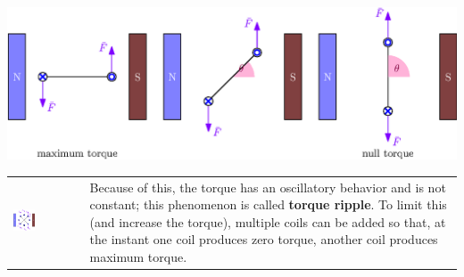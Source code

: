 \documentclass[10pt, letterpaper]{report}
\begin{document}
\begin{center}
    \includegraphics[width=1\textwidth ]{images/variazioneCoppia.eps}
\end{center}
\begin{center}
	\begin{tabular}{>{\centering\arraybackslash}m{3in}>{\arraybackslash}m{3in}}
        \includegraphics[width=0.33\textwidth ]{images/variazioneCoppia2.eps} & Because of this, the torque has an oscillatory behavior and is not constant; this phenomenon is called \textbf{torque ripple}. To limit this (and increase the torque), multiple coils can be added so that, at the instant one coil produces zero torque, another coil produces maximum torque.
		\\
	\end{tabular}
\end{center}
\end{document}
